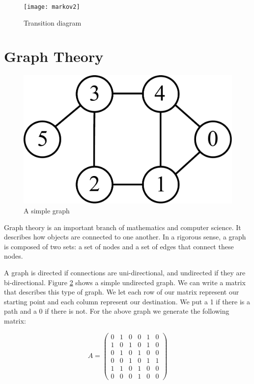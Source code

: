 \begin{figure}[h!]
\begin{center}
\texttt{[image: markov2]}
\end{center}
\caption{Transition diagram}
\label{markov2}
\end{figure}

\newpage

\section*{Graph Theory}
\begin{figure}[h!]
\includegraphics[scale = .4]{graphExample}
\caption{A simple graph}
\label{markov:example_graph}
\end{figure}

Graph theory is an important branch of mathematics and computer science.
It describes how objects are connected to one another.
In a rigorous sense, a graph is composed of two sets: a set of nodes and a set of edges that connect these nodes. 

A graph is directed if connections are uni-directional, and undirected if they are bi-directional.
Figure \ref{markov:example_graph} shows a simple undirected graph.
We can write a matrix that describes this type of graph.
We let each row of our matrix represent our starting point and each column represent our destination.
We put a 1 if there is a path and a 0 if there is not.
For the above graph we generate the following matrix:

\[
A = \begin{pmatrix}
0 & 1 & 0 & 0 & 1 & 0\\
1 & 0 & 1 & 0 & 1 & 0\\
0 & 1 & 0 & 1 & 0 & 0\\
0 & 0 & 1 & 0 & 1 & 1\\
1 & 1 & 0 & 1 & 0 & 0\\
0 & 0 & 0 & 1 & 0 & 0
\end{pmatrix}
\]

